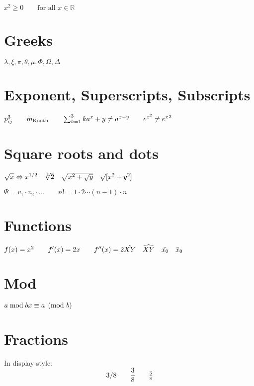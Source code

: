 \documentclass{article}
\begin{document}
\bigskip
\noindent $x^{2} \geq 0\qquad
 \text{for all } x
 \in \mathbb{R}$

\section{Greeks}
\begin{center}
$\lambda,\xi,\pi,\theta,
 \mu,\Phi,\Omega,\Delta$
\end{center}

\section{Exponent, Superscripts, Subscripts}

$p^3_{ij} \qquad
 m_\text{Knuth}\qquad
\sum_{k=1}^3 k \\[5pt]
 a^x+y \neq a^{x+y}\qquad
 e^{x^2} \neq {e^x}^2$

\section{Square roots and dots}

$\sqrt{x} \Leftrightarrow x^{1/2}
 \quad \sqrt[3]{2}
 \quad \sqrt{x^{2} + \sqrt{y}}
 \quad \surd[x^2 + y^2]$

$\Psi = v_1 \cdot v_2
 \cdot \ldots \qquad
 n! = 1 \cdot 2
 \cdots (n-1) \cdot n$

\section{Functions}

$f(x) = x^2 \qquad f'(x)
 = 2x \qquad f''(x) = 2\\[5pt]
 \hat{XY} \quad \widehat{XY}
 \quad \bar{x_0} \quad \bar{x}_0$
 
 \section{Mod}
 
$a\bmod b \\
 x\equiv a \pmod{b}$

\section{Fractions}

In display style:
\begin{equation*}
  3/8 \qquad \frac{3}{8}
  \qquad \tfrac{3}{8}
\end{equation*}
\end{document}
